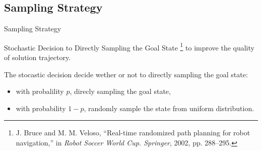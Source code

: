 \documentclass{beamer}
\begin{document}
\subsection{Sampling Strategy}

\begin{frame}{Sampling Strategy}

Stochastic Decision to Directly Sampling the Goal State \footnote{J. Bruce and M. M. Veloso, “Real-time randomized path planning for robot
navigation,” in \emph{Robot Soccer World Cup. Springer}, 2002, pp. 288–295.} to improve the quality of solution trajectory. 

The stocastic decision decide wether or not to directly sampling the goal state:

\begin{itemize}
\item with probalility $p$, direcly sampling the goal state,
\item with probability $1-p$, randomly sample the state from uniform distribution.
\end{itemize}

\end{frame}
\end{document}
